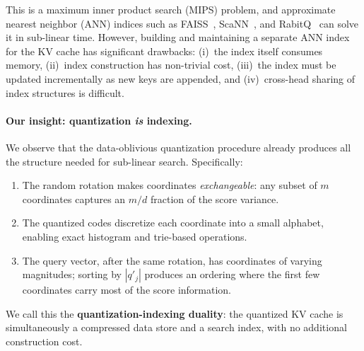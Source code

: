 \documentclass[10pt,twocolumn]{article}
\theoremstyle{definition}
\begin{document}
This is a maximum inner product search (MIPS) problem, and approximate nearest
neighbor (ANN) indices such as FAISS~\cite{faiss2024}, ScaNN~\cite{scann2020},
and RabitQ~\cite{rabitq2024} can solve it in sub-linear time.  However, building
and maintaining a separate ANN index for the KV cache has significant drawbacks:
(i)~the index itself consumes memory, (ii)~index construction has non-trivial
cost, (iii)~the index must be updated incrementally as new keys are appended,
and (iv)~cross-head sharing of index structures is difficult.

\paragraph{Our insight: quantization \emph{is} indexing.}
We observe that the data-oblivious quantization procedure already produces all
the structure needed for sub-linear search.  Specifically:
\begin{enumerate}[nosep]
  \item The random rotation makes coordinates \emph{exchangeable}: any subset of
        $m$ coordinates captures an $m/d$ fraction of the score variance.
  \item The quantized codes discretize each coordinate into a small alphabet,
        enabling exact histogram and trie-based operations.
  \item The query vector, after the same rotation, has coordinates of varying
        magnitudes; sorting by $|q'_j|$ produces an ordering where the first
        few coordinates carry most of the score information.
\end{enumerate}
We call this the \textbf{quantization-indexing duality}: the quantized KV cache
is simultaneously a compressed data store and a search index, with no additional
construction cost.
\end{document}

